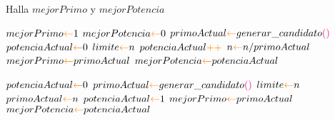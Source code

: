 \begin{algorithm}
\caption{Halla $mejorPrimo$ y $mejorPotencia$}
\begin{algorithmic}[1]
\STATE $mejorPrimo \textcolor{orange}{\leftarrow} 1$
\STATE $mejorPotencia \textcolor{orange}{\leftarrow} 0$
\STATE $primoActual \textcolor{orange}{\leftarrow} generar\_candidato\textcolor{magenta}{(}\textcolor{magenta}{)}$
\STATE $potenciaActual \textcolor{orange}{\leftarrow} 0$
\STATE $limite \textcolor{orange}{\leftarrow} n$
        \STATE $potenciaActual\textcolor{orange}{+}\textcolor{orange}{+}$
        \STATE $n \textcolor{orange}{\leftarrow} n/primoActual$
    \ELSE
            \STATE $mejorPrimo \textcolor{orange}{\leftarrow} primoActual$
            \STATE $mejorPotencia \textcolor{orange}{\leftarrow} potenciaActual$
        \ENDIF

        \STATE $potenciaActual \textcolor{orange}{\leftarrow} 0$
        \STATE $primoActual \textcolor{orange}{\leftarrow} generar\_candidato\textcolor{magenta}{(}\textcolor{magenta}{)}$
        \STATE $limite \textcolor{orange}{\leftarrow} n$
    \ENDIF
\ENDWHILE
{}
    \STATE $primoActual \textcolor{orange}{\leftarrow} n$
    \STATE $potenciaActual \textcolor{orange}{\leftarrow} 1$
\ENDIF
{}
    \STATE $mejorPrimo \textcolor{orange}{\leftarrow} primoActual$
    \STATE $mejorPotencia \textcolor{orange}{\leftarrow} potenciaActual$
\ENDIF
\end{algorithmic}
\end{algorithm}
